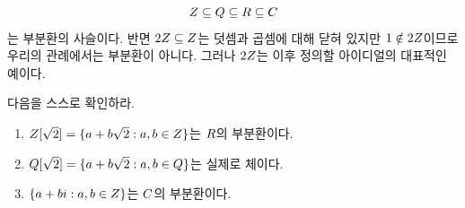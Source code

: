 \begin{example}
\[
  Z\subseteq Q\subseteq R\subseteq C
\]
는 부분환의 사슬이다. 반면 $2Z\subseteq Z$는 덧셈과 곱셈에 대해 닫혀 있지만 $1\notin2Z$이므로 우리의 관례에서는 부분환이 아니다. 그러나 $2Z$는 이후 정의할 아이디얼의 대표적인 예이다.
\end{example}

\begin{checkpoint}
다음을 스스로 확인하라.
\begin{enumerate}[label=(\alph*)]
  \item $Z[\sqrt2]=\{a+b\sqrt2:a,b\in Z\}$는 $R$의 부분환이다.
  \item $Q[\sqrt2]=\{a+b\sqrt2:a,b\in Q\}$는 실제로 체이다.
  \item $\{a+bi:a,b\in Z\}$는 $C$의 부분환이다.
\end{enumerate}
\end{checkpoint}
